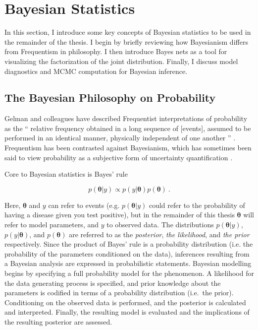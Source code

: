 \section{Bayesian Statistics}

In this section, I introduce some key concepts of Bayesian statistics to be used in the remainder of the thesis.  I begin by briefly reviewing how Bayesianism differs from Frequentism in philosophy.  I then introduce Bayes nets as a tool for visualizing the factorization of the joint distribution.  Finally, I discuss model diagnostics and MCMC computation for Bayesian inference.


\subsection{The Bayesian Philosophy on Probability}


Gelman and colleagues have described Frequentist interpretations of probability as the `` relative frequency obtained in a long sequence of [events], assumed to be performed in an identical manner, physically independent of one another ''   \cite[p.~12]{gelman2013bayesian}.   Frequentism has been contrasted against Bayesianism, which has sometimes been said to view probability as a subjective form of uncertainty quantification \cite{gelman2013bayesian}.

Core to Bayesian statistics is Bayes' rule \cite[p.~7]{gelman2013bayesian}

\begin{equation}\label{Bayes}
	p( \bm{\theta} \vert y) \propto p(y \vert \bm{\theta}) p(\bm{\theta}) \>.
\end{equation}

\noindent  Here, $ \bm{\theta} $  and $y$ can refer to events (e.g. $p(\bm{\theta} \vert y)$ could refer to the probability of having a disease given you test positive), but in the remainder of this thesis $\bm{\theta}$ will refer to model parameters, and $ y $ to observed data.  The distributions $ p( \bm{\theta} \vert y) $, $ p(y \vert \bm{\theta}) $, and $p(\bm{\theta})$ are referred to as the \textit{posterior}, \textit{the likelihood}, and \textit{the prior} respectively.  Since the product of Bayes' rule is a probability distribution (i.e. the probability of the parameters conditioned on the data), inferences resulting from a Bayesian analysis are expressed in probabilistic statements. Bayesian modelling begins by specifying a full probability model for the phenomenon.  A likelihood for the data generating process is specified, and prior knowledge about the parameters is codified in terms of a probability distribution (i.e.\ the prior).  Conditioning on the observed data is performed, and the posterior is calculated and interpreted.  Finally, the resulting model is evaluated and the implications of the resulting posterior are assessed.  

